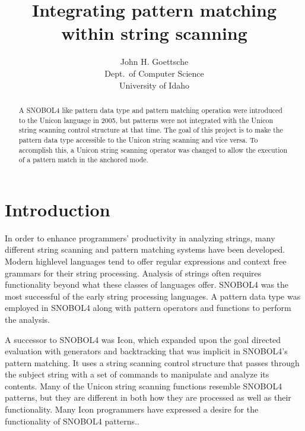 \documentclass{article}
\begin{document}
\linespread{1}
\title{Integrating pattern matching\\
within string scanning}
\author{John H. Goettsche\\
  Dept.\ of Computer Science\\
  University of Idaho}

\maketitle

\begin{abstract}
A SNOBOL4 like pattern data type and pattern matching operation were introduced to the Unicon language in 2005, but patterns were not integrated with the Unicon string scanning control structure at that time.  The goal of this project is to make the pattern data type accessible to the Unicon string scanning and vice versa.  To accomplish this, a Unicon string scanning operator was changed to allow the execution of a pattern match in the anchored mode. 

\end{abstract}

\pagebreak
\linespread{1}
\tableofcontents

\pagebreak
\section{Introduction}
In order to enhance programmers' productivity in analyzing strings, many different string scanning and pattern matching systems have been developed.  Modern highlevel languages tend to offer regular expressions and context free grammars for their string processing.  Analysis of strings often requires functionality beyond what these classes of languages offer.  SNOBOL4 was the most successful of the early string processing languages. \cite{Snobol, Gaikaiwari2005}  A pattern data type was employed in SNOBOL4 along with pattern operators and functions to perform the analysis.

A successor to SNOBOL4 was Icon, which expanded upon the goal directed evaluation with generators and backtracking that was implicit in SNOBOL4's pattern matching.\cite{GriswoldIcon, Gaikaiwari2005}  It uses a string scanning control structure that passes through the subject string with a set of commands to manipulate and analyze its contents.  Many of the Unicon string scanning functions resemble SNOBOL4 patterns, but they are different in both how they are processed as well as their functionality.  Many Icon programmers have expressed a desire for the functionality of SNOBOL4 patterns.\cite{Griswold1980}.
\end{document}
